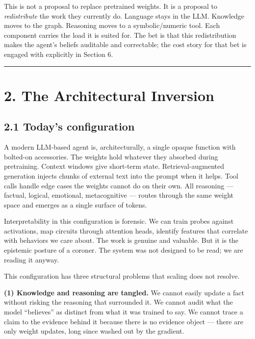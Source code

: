 \documentclass[12pt]{article}
\begin{document}
This is not a proposal to replace pretrained weights. It is a proposal to \emph{redistribute} the work they currently do. Language stays in the LLM. Knowledge moves to the graph. Reasoning moves to a symbolic/numeric tool. Each component carries the load it is suited for. The bet is that this redistribution makes the agent's beliefs auditable and correctable; the cost story for that bet is engaged with explicitly in Section 6.

\begin{center}\rule{0.5\linewidth}{0.5pt}\end{center}

\section{2. The Architectural Inversion}\label{the-architectural-inversion}

\subsection{2.1 Today's configuration}\label{todays-configuration}

A modern LLM-based agent is, architecturally, a single opaque function with bolted-on accessories. The weights hold whatever they absorbed during pretraining. Context windows give short-term state. Retrieval-augmented generation injects chunks of external text into the prompt when it helps. Tool calls handle edge cases the weights cannot do on their own. All reasoning --- factual, logical, emotional, metacognitive --- routes through the same weight space and emerges as a single surface of tokens.

Interpretability in this configuration is forensic. We can train probes against activations, map circuits through attention heads, identify features that correlate with behaviors we care about. The work is genuine and valuable. But it is the epistemic posture of a coroner. The system was not designed to be read; we are reading it anyway.

This configuration has three structural problems that scaling does not resolve.

\textbf{(1) Knowledge and reasoning are tangled.} We cannot easily update a fact without risking the reasoning that surrounded it. We cannot audit what the model ``believes'' as distinct from what it was trained to say. We cannot trace a claim to the evidence behind it because there is no evidence object --- there are only weight updates, long since washed out by the gradient.
\end{document}
